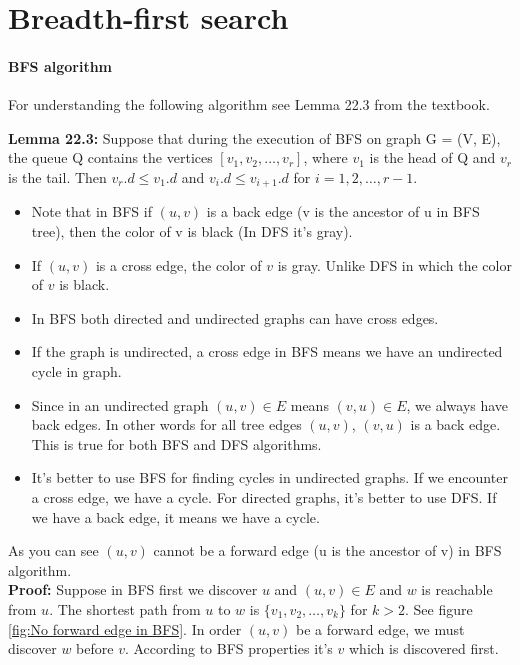 \documentclass{book}
\begin{document}
	\section{Breadth-first search}
	\label{psec:BFSAlgorithm}
	\paragraph{BFS algorithm}
	For understanding the following algorithm see Lemma 22.3 from the textbook.
	
	\textbf{Lemma 22.3: } Suppose that during the execution of BFS on graph G = (V, E), the queue Q contains the vertices $[v_1, v_2, \dots , v_r]$, where $v_1$ is the head of Q and $v_r$ is the tail. Then $v_r.d \le v_1.d$ and $v_i.d \le v_{i+1}.d$ for $i = 1, 2, \dots, r - 1$.\\
	
	\begin{itemize}
		\item Note that in BFS if $(u, v)$ is a back edge (v is the ancestor of u in BFS tree), then the color of v is black (In DFS it's gray).
		
				
		\item If $(u, v)$ is a cross edge, the color of $v$ is gray. Unlike DFS in which the color of $v$ is black.
		
		\item In BFS both directed and undirected graphs can have cross edges.
		
		\item If the graph is undirected, a cross edge in BFS means we have an undirected cycle in graph.
		
		\item Since in an undirected graph $(u, v) \in E$ means $(v, u) \in E$, we always have back edges. In other words for all tree edges $(u, v)$, $(v, u)$ is a back edge. This is true for both BFS and DFS algorithms.
		
		\item It's better to use BFS for finding cycles in undirected graphs. If we encounter a cross edge, we have a cycle. For directed graphs, it's better to use DFS. If we have a back edge, it means we have a cycle.
		 
	\end{itemize}
	
	
	As you can see $(u, v)$ cannot be a forward edge (u is the ancestor of v) in BFS algorithm. \\
	
	\textbf{Proof:} Suppose in BFS first we discover $u$ and $(u, v) \in E$ and $w$ is reachable from $u$. The shortest path from $u$ to $w$ is $\{v_1, v_2, \dots, v_k\}$ for $k > 2$. See figure \ref{fig:No forward edge in BFS}. In order $(u, v)$ be a forward edge, we must discover $w$ before $v$. According to BFS properties it's $v$ which is discovered first.
	
\end{document}
